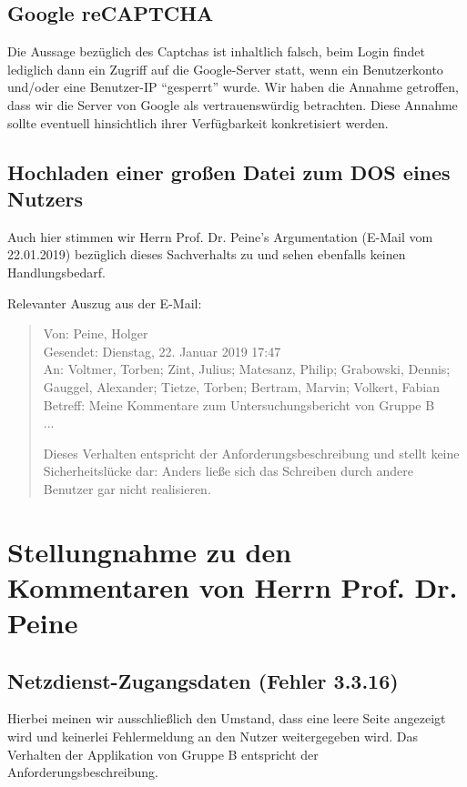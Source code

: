 \documentclass[12pt,DIV14,BCOR10mm,a4paper,parskip=half-,headsepline,headinclude,english,ngerman,bibliography=totocnumbered]{scrreprt}
\begin{document}
\section{Google reCAPTCHA}

Die Aussage bezüglich des Captchas ist inhaltlich falsch, beim Login findet lediglich dann ein Zugriff auf die Google-Server statt, wenn ein Benutzerkonto und/oder eine Benutzer-IP \enquote{gesperrt} wurde.
Wir haben die Annahme getroffen, dass wir die Server von Google als vertrauenswürdig betrachten.
Diese Annahme sollte eventuell hinsichtlich ihrer Verfügbarkeit konkretisiert werden.

\section{Hochladen einer großen Datei zum DOS eines Nutzers}

Auch hier stimmen wir Herrn Prof. Dr. Peine's Argumentation (E-Mail vom 22.01.2019) bezüglich dieses Sachverhalts zu und sehen ebenfalls keinen Handlungsbedarf.

Relevanter Auszug aus der E-Mail:

\blockquote{
Von: Peine, Holger \\
Gesendet: Dienstag, 22. Januar 2019 17:47 \\
An: Voltmer, Torben; Zint, Julius; Matesanz, Philip; Grabowski, Dennis; Gauggel, Alexander; Tietze, Torben; Bertram, Marvin; Volkert, Fabian  \\
Betreff: Meine Kommentare zum Untersuchungsbericht von Gruppe B \\

...

Dieses Verhalten entspricht der Anforderungsbeschreibung und stellt
keine Sicherheitslücke dar: Anders ließe sich das Schreiben durch andere
Benutzer gar nicht realisieren.
}

\chapter{Stellungnahme zu den Kommentaren von Herrn Prof. Dr. Peine}

\section{Netzdienst-Zugangsdaten (Fehler 3.3.16)}

Hierbei meinen wir ausschließlich den Umstand, dass eine leere Seite angezeigt wird und keinerlei Fehlermeldung an den Nutzer weitergegeben wird.
Das Verhalten der Applikation von Gruppe B entspricht der Anforderungsbeschreibung.
\end{document}
